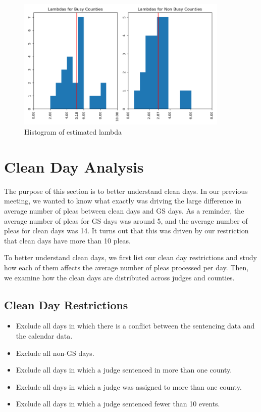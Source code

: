 \documentclass[11pt]{article}
\begin{document}
    \begin{figure}[H]
      \includegraphics[width=0.9\textwidth]{../../../output/figures/Exploration/lambda_hists.png}
      \caption{Histogram of estimated lambda}
      \label{lambda-hist}
    \end{figure}

\section{Clean Day Analysis}
  The purpose of this section is to better understand clean days.
  In our previous meeting, we wanted to know what exactly was driving the large difference in average number of pleas between clean days and GS days. As a reminder, the average number of pleas for GS days was around 5, and the average number of pleas for clean days was 14. It turns out that this
  was driven by our restriction that clean days have more than 10 pleas.

  To better understand clean days, we first
  list our clean day restrictions and study how each of them affects the average number of
  pleas processed per day. Then, we examine how the clean days are distributed across
  judges and counties.

  \subsection{Clean Day Restrictions}
    \begin{itemize}
      \item Exclude all days in which there is a conflict between the sentencing data and the calendar data.
      \item Exclude all non-GS days.
      \item Exclude all days in which a judge sentenced in more than one county.
      \item Exclude all days in which a judge was assigned to more than one county.
      \item Exclude all days in which a judge sentenced fewer than 10 events.
    \end{itemize}
\end{document}

